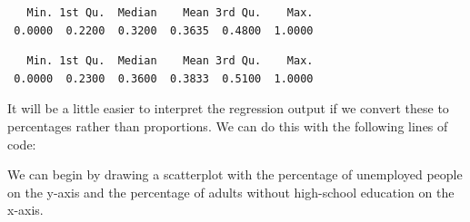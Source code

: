 \documentclass[]{article}
\newenvironment{Shaded}{\begin{snugshade}}{\end{snugshade}}
\newcommand{\DataTypeTok}[1]{\textcolor[rgb]{0.13,0.29,0.53}{#1}}
\newcommand{\DecValTok}[1]{\textcolor[rgb]{0.00,0.00,0.81}{#1}}
\newcommand{\KeywordTok}[1]{\textcolor[rgb]{0.13,0.29,0.53}{\textbf{#1}}}
\newcommand{\NormalTok}[1]{#1}
\newcommand{\OperatorTok}[1]{\textcolor[rgb]{0.81,0.36,0.00}{\textbf{#1}}}
\newcommand{\OtherTok}[1]{\textcolor[rgb]{0.56,0.35,0.01}{#1}}
\newcommand{\StringTok}[1]{\textcolor[rgb]{0.31,0.60,0.02}{#1}}
\begin{document}
\begin{verbatim}
   Min. 1st Qu.  Median    Mean 3rd Qu.    Max. 
 0.0000  0.2200  0.3200  0.3635  0.4800  1.0000 
\end{verbatim}

\begin{Shaded}
\end{Shaded}

\begin{verbatim}
   Min. 1st Qu.  Median    Mean 3rd Qu.    Max. 
 0.0000  0.2300  0.3600  0.3833  0.5100  1.0000 
\end{verbatim}

It will be a little easier to interpret the regression output if we convert these to percentages rather than proportions. We can do this with the following lines of code:

\begin{Shaded}
\end{Shaded}

We can begin by drawing a scatterplot with the percentage of unemployed people on the y-axis and the percentage of adults without high-school education on the x-axis.

\begin{Shaded}
\end{Shaded}
\end{document}
